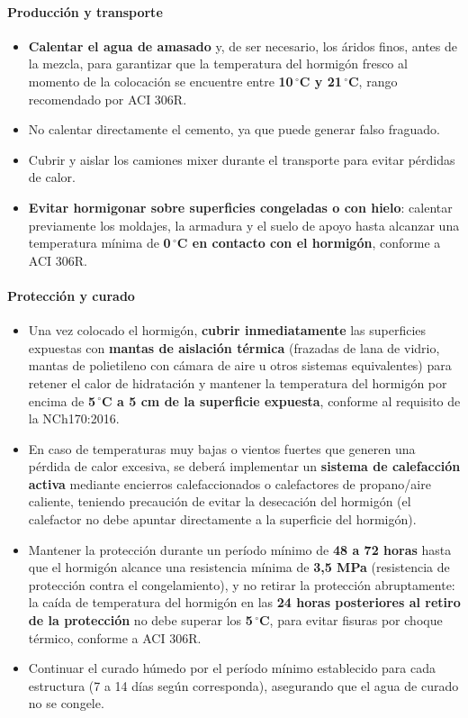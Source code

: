 \paragraph{Producción y transporte}
\begin{itemize}
    \item \textbf{Calentar el agua de amasado} y, de ser necesario, los áridos finos, antes de la mezcla, para garantizar que la temperatura del hormigón fresco al momento de la colocación se encuentre entre \textbf{10\,$^\circ$C y 21\,$^\circ$C}, rango recomendado por ACI 306R.
    \item No calentar directamente el cemento, ya que puede generar falso fraguado.
    \item Cubrir y aislar los camiones mixer durante el transporte para evitar pérdidas de calor.
    \item \textbf{Evitar hormigonar sobre superficies congeladas o con hielo}: calentar previamente los moldajes, la armadura y el suelo de apoyo hasta alcanzar una temperatura mínima de \textbf{0\,$^\circ$C en contacto con el hormigón}, conforme a ACI 306R.
\end{itemize}

\paragraph{Protección y curado}
\begin{itemize}
    \item Una vez colocado el hormigón, \textbf{cubrir inmediatamente} las superficies expuestas con \textbf{mantas de aislación térmica} (frazadas de lana de vidrio, mantas de polietileno con cámara de aire u otros sistemas equivalentes) para retener el calor de hidratación y mantener la temperatura del hormigón por encima de \textbf{5\,$^\circ$C a 5 cm de la superficie expuesta}, conforme al requisito de la NCh170:2016.
    \item En caso de temperaturas muy bajas o vientos fuertes que generen una pérdida de calor excesiva, se deberá implementar un \textbf{sistema de calefacción activa} mediante encierros calefaccionados o calefactores de propano/aire caliente, teniendo precaución de evitar la desecación del hormigón (el calefactor no debe apuntar directamente a la superficie del hormigón).
    \item Mantener la protección durante un período mínimo de \textbf{48 a 72 horas} hasta que el hormigón alcance una resistencia mínima de \textbf{3,5 MPa} (resistencia de protección contra el congelamiento), y no retirar la protección abruptamente: la caída de temperatura del hormigón en las \textbf{24 horas posteriores al retiro de la protección} no debe superar los \textbf{5\,$^\circ$C}, para evitar fisuras por choque térmico, conforme a ACI 306R.
    \item Continuar el curado húmedo por el período mínimo establecido para cada estructura (7 a 14 días según corresponda), asegurando que el agua de curado no se congele.
\end{itemize}

